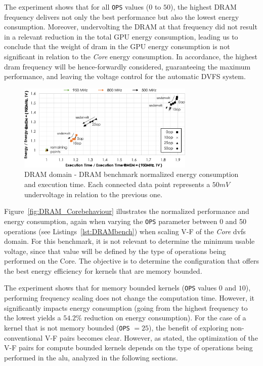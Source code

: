 The experiment shows that for all \texttt{OPS} values ($0$ to $50$), the highest DRAM frequency delivers not only the best performance but also the lowest energy consumption. Moreover, undervolting the DRAM at that frequency did not result in a relevant reduction in the total GPU energy consumption, leading us to conclude that the weight of \acrshort{dram} in the GPU energy consumption is not significant in relation to the \textit{Core} energy consumption. In accordance, the highest \acrshort{dram} frequency will be hence-forwardly considered, guaranteeing the maximum performance, and leaving the voltage control for the automatic DVFS system.


\begin{figure}[htb]
  \centering
  \includegraphics[width=0.75\textwidth]{Figures/GPU_characterization/DRAM_behaviour.pdf}
  \caption{DRAM domain - DRAM benchmark normalized energy consumption and execution time. Each connected data point represents a $50mV$ undervoltage in relation to the previous one.}
  \label{fig:DRAM_behaviour}
\end{figure}

Figure~\ref{fig:DRAM_Corebehaviour} illustrates the normalized performance and energy consumption, again when varying the \texttt{OPS} parameter between 0 and 50 operations (see Listings~\ref{lst:DRAMbench}) when scaling V-F of the \textit{Core} \acrshort{dvfs} domain. For this benchmark, it is not relevant to determine the minimum usable voltage, since that value will be defined by the type of operations being performed on the Core. The objective is to determine the configuration that offers the best energy efficiency for kernels that are memory bounded.  

The experiment shows that for memory bounded kernels (\texttt{OPS} values $0$ and $10$), performing frequency scaling does not change the computation time. However, it significantly impacts energy consumption (going from the highest frequency to the lowest yields a $54.2\%$ reduction on energy consumption). For the case of a kernel that is not memory bounded  (\texttt{OPS} $=25$), the benefit of exploring non-conventional V-F pairs becomes clear. However, as stated, the optimization of the V-F pairs for compute bounded kernels depends on the type of operations being performed in the \acrshort{alu}, analyzed in the following sections.

